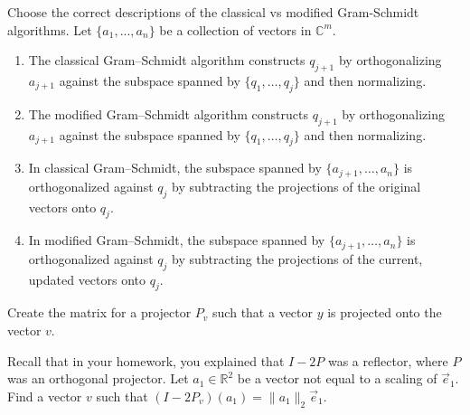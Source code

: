 \documentclass{ximera}
\begin{document}
\begin{exercise}
    Choose the correct descriptions of the classical vs modified Gram-Schmidt algorithms.  Let $\{a_1, ..., a_n\}$ be a collection of vectors in $\mathbb{C}^m$.
    \begin{enumerate}
         \item The classical Gram--Schmidt algorithm constructs
        $q_{j+1}$ by orthogonalizing $a_{j+1}$ against the subspace
        spanned by $\{q_1,\ldots,q_j\}$ and then normalizing.
        \item The modified Gram--Schmidt algorithm constructs
        $q_{j+1}$ by orthogonalizing $a_{j+1}$ against the subspace
        spanned by $\{q_1,\ldots,q_j\}$ and then normalizing.
        \item In classical Gram--Schmidt, the subspace spanned by
        $\{a_{j+1},\ldots,a_n\}$ is orthogonalized against $q_j$
        by subtracting the projections of the original vectors
        onto $q_j$.
        \item In modified Gram--Schmidt, the subspace spanned by
        $\{a_{j+1},\ldots,a_n\}$ is orthogonalized against $q_j$
        by subtracting the projections of the current, updated
        vectors onto $q_j$.
    \end{enumerate}
\end{exercise}

\begin{exercise}
     Create the matrix for a projector $P_v$ such that a vector $y$ is projected onto the vector $v$.
\end{exercise}

\begin{exercise}
Recall that in your homework, you explained that $I-2P$ was a reflector, where $P$ was an orthogonal projector.  Let $a_1\in \mathbb{R}^2$ be a vector not equal to a scaling of $\vec{e}_1$.  Find a vector $v$ such that $(I-2P_v)(a_1) = \|a_1\|_2\vec{e}_1$. 
\end{exercise}
\end{document}
